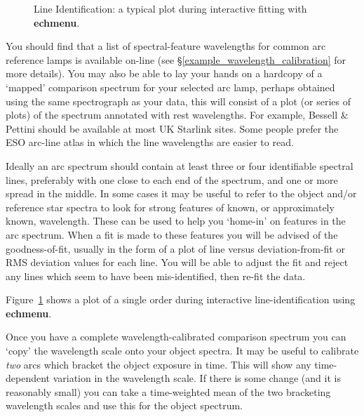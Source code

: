 \documentclass[twoside,11pt]{article}
\newcommand{\htmlref}[2]{#1}
\newcommand{\xref}[3]{#1}
\newcommand{\xlabel}[1]{}
\newcommand{\mlabel}[1]{\xlabel{#1}\label{#1}}
\newcommand{\scspec}[2]{#1}
\newcommand{\scspec}[2]{#2}
\begin{document}
\begin{figure}
\begin{center}
  \scspec{\leavevmode\epsfysize=105mm\epsfbox{sc7_08.eps}}
         {\leavevmode\epsfysize=136mm}

  \parbox{140mm}{
    \caption{Line Identification: a typical plot during interactive 
             fitting with \xref{{\bf echmenu}}{sun152}{}.}
    \label{fi_echarc_plot}
  }
\end{center}
\end{figure}

\mlabel{atlases}
You should find that a list of spectral-feature wavelengths for
common arc reference lamps is available on-line (see
\scspec{\S\ref{example_wavelength_calibration}}{the \xref{worked
example}{example_wavelength_calibration}} for more details).
You may also be able to lay your hands on a hardcopy of a `mapped'
\htmlref{comparison spectrum}{gl_comparison} for your selected
\htmlref{arc lamp}{gl_arc},  perhaps obtained using
the same spectrograph as your data, this will consist of a plot
(or series of plots) of the spectrum annotated with rest wavelengths.
For example, Bessell \& Pettini\cite{echref} should be available
at most UK Starlink sites.
Some people prefer the \htmlref{ESO}{gl_eso} arc-line atlas\cite{eso_main}
in which the line wavelengths are easier to read.

Ideally an arc spectrum should contain at least three or four
identifiable spectral lines, preferably with one close to each
end of the spectrum, and one or more spread in the middle.
In some cases it may be useful to refer to the object and/or reference star
spectra to look for strong features of known, or approximately known,
wavelength.
These can be used to help you `home-in' on features in the arc spectrum.
When a fit is made to these features you will be advised of the
goodness-of-fit, usually in the form of a plot of line versus
deviation-from-fit or RMS deviation values for each line.
You will be able to adjust the fit and reject any lines which
seem to have been mis-identified, then re-fit the data.

\scspec{Figure~\ref{fi_echarc_plot}}{The figure above} shows a plot of a
single order during interactive line-identification using
\xref{{\bf echmenu}}{sun152}{}.

Once you have a complete wavelength-calibrated comparison spectrum you
can `copy' the wavelength scale onto your object spectra.
It may be useful to calibrate {\em two} arcs which
\htmlref{bracket}{gl_bracketing} the object exposure in time.
This will show any time-dependent variation in the wavelength scale.
If there is some change (and it is reasonably small) you can
take a time-weighted mean of the two bracketing wavelength scales and use
this for the object spectrum.
\end{document}
